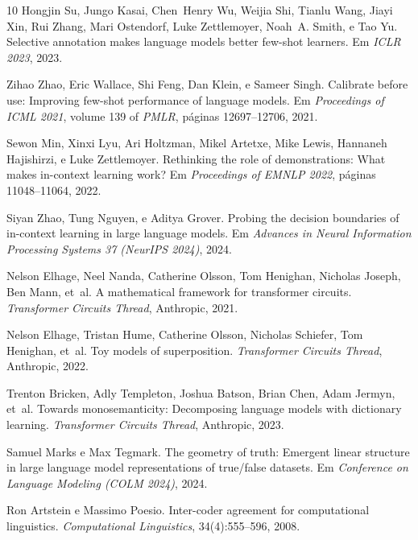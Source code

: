 \documentclass[12pt,a4paper]{article}
\begin{document}
\begin{thebibliography}{10}
Hongjin Su, Jungo Kasai, Chen~Henry Wu, Weijia Shi, Tianlu Wang, Jiayi Xin,
  Rui Zhang, Mari Ostendorf, Luke Zettlemoyer, Noah~A. Smith, e Tao Yu.
\newblock Selective annotation makes language models better few-shot learners.
\newblock Em \emph{ICLR 2023}, 2023.

Zihao Zhao, Eric Wallace, Shi Feng, Dan Klein, e Sameer Singh.
\newblock Calibrate before use: Improving few-shot performance of language
  models.
\newblock Em \emph{Proceedings of ICML 2021}, volume 139 of \emph{PMLR},
  páginas 12697--12706, 2021.

Sewon Min, Xinxi Lyu, Ari Holtzman, Mikel Artetxe, Mike Lewis, Hannaneh
  Hajishirzi, e Luke Zettlemoyer.
\newblock Rethinking the role of demonstrations: What makes in-context learning
  work?
\newblock Em \emph{Proceedings of EMNLP 2022}, páginas 11048--11064, 2022.

Siyan Zhao, Tung Nguyen, e Aditya Grover.
\newblock Probing the decision boundaries of in-context learning in large
  language models.
\newblock Em \emph{Advances in Neural Information Processing Systems 37
  (NeurIPS 2024)}, 2024.

Nelson Elhage, Neel Nanda, Catherine Olsson, Tom Henighan, Nicholas Joseph,
  Ben Mann, et~al.
\newblock A mathematical framework for transformer circuits.
\newblock \emph{Transformer Circuits Thread}, Anthropic, 2021.

Nelson Elhage, Tristan Hume, Catherine Olsson, Nicholas Schiefer, Tom
  Henighan, et~al.
\newblock Toy models of superposition.
\newblock \emph{Transformer Circuits Thread}, Anthropic, 2022.

Trenton Bricken, Adly Templeton, Joshua Batson, Brian Chen, Adam Jermyn,
  et~al.
\newblock Towards monosemanticity: Decomposing language models with
  dictionary learning.
\newblock \emph{Transformer Circuits Thread}, Anthropic, 2023.

Samuel Marks e Max Tegmark.
\newblock The geometry of truth: Emergent linear structure in large language
  model representations of true/false datasets.
\newblock Em \emph{Conference on Language Modeling (COLM 2024)}, 2024.

Ron Artstein e Massimo Poesio.
\newblock Inter-coder agreement for computational linguistics.
\newblock \emph{Computational Linguistics}, 34(4):555--596, 2008.


\end{thebibliography}
\end{document}
